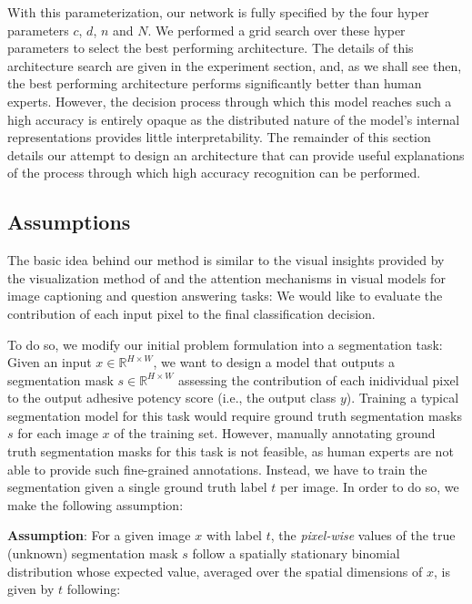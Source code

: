 \documentclass[10pt,twocolumn,letterpaper]{article}
\begin{document}
With this parameterization, our network is fully specified by the four hyper parameters $c$, $d$, $n$ and $N$.
We performed a grid search over these hyper parameters to select the best performing architecture.
The details of this architecture search are given in the experiment section,
and, as we shall see then, the best performing architecture performs significantly better than human experts.
However, the decision process through which this model reaches such a high accuracy is entirely opaque
as the distributed nature of the model's internal representations provides little interpretability.
The remainder of this section details our attempt to design an architecture that can provide 
useful explanations of the process through which high accuracy recognition can be performed.

\subsection{Assumptions}
The basic idea behind our method is similar to the visual insights provided by the
visualization method of \cite{long2015fully}\cite{He_2016_CVPR} and the attention mechanisms in visual models 
for image captioning\cite{you2016image} and question answering tasks:
We would like to evaluate the contribution of each input pixel to the final classification decision. 

To do so, we modify our initial problem formulation into a segmentation task:
Given an input $x \in \mathbb{R}^{H \times W}$, we want to design a model that outputs 
a segmentation mask $s \in \mathbb{R}^{H \times W}$ assessing the contribution of each inidividual pixel to the output adhesive potency score (i.e., the output class $y$).
Training a typical segmentation model for this task would require ground truth 
segmentation masks $s$ for each image $x$ of the training set.
However, manually annotating ground truth segmentation masks for this task is not feasible, 
as human experts are not able to provide such fine-grained annotations.
Instead, we have to train the segmentation given a single ground truth label $t$ per image.
In order to do so, we make the following assumption:

\textbf{Assumption}: 
For a given image $x$ with label $t$, 
the \textit{pixel-wise} values of the true (unknown) segmentation mask $s$
follow a spatially stationary binomial distribution whose expected value, 
averaged over the spatial dimensions of $x$, is given by $t$ following:
\end{document}
